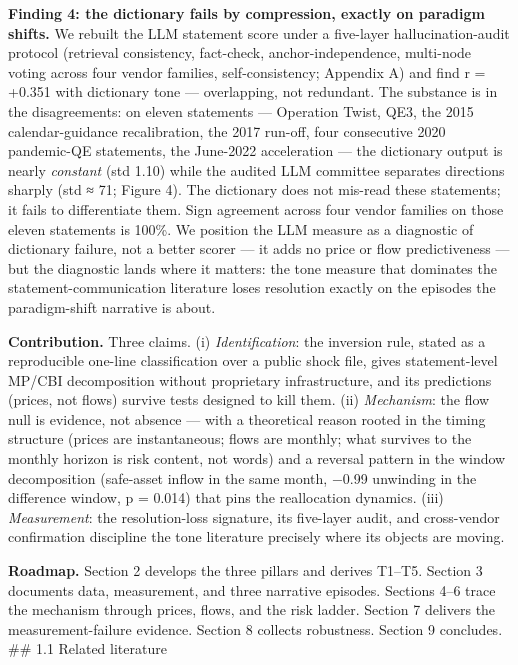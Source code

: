 \textbf{Finding 4: the dictionary fails by compression, exactly on paradigm shifts.} We rebuilt the LLM statement score under a five-layer hallucination-audit protocol (retrieval consistency, fact-check, anchor-independence, multi-node voting across four vendor families, self-consistency; Appendix A) and find r = +0.351 with dictionary tone --- overlapping, not redundant. The substance is in the disagreements: on eleven statements --- Operation Twist, QE3, the 2015 calendar-guidance recalibration, the 2017 run-off, four consecutive 2020 pandemic-QE statements, the June-2022 acceleration --- the dictionary output is nearly \emph{constant} (std 1.10) while the audited LLM committee separates directions sharply (std ≈ 71; Figure 4). The dictionary does not mis-read these statements; it fails to differentiate them. Sign agreement across four vendor families on those eleven statements is 100\%. We position the LLM measure as a diagnostic of dictionary failure, not a better scorer --- it adds no price or flow predictiveness --- but the diagnostic lands where it matters: the tone measure that dominates the statement-communication literature loses resolution exactly on the episodes the paradigm-shift narrative is about.

\textbf{Contribution.} Three claims. (i) \emph{Identification}: the inversion rule, stated as a reproducible one-line classification over a public shock file, gives statement-level MP/CBI decomposition without proprietary infrastructure, and its predictions (prices, not flows) survive tests designed to kill them. (ii) \emph{Mechanism}: the flow null is evidence, not absence --- with a theoretical reason rooted in the timing structure (prices are instantaneous; flows are monthly; what survives to the monthly horizon is risk content, not words) and a reversal pattern in the window decomposition (safe-asset inflow in the same month, −0.99 unwinding in the difference window, p = 0.014) that pins the reallocation dynamics. (iii) \emph{Measurement}: the resolution-loss signature, its five-layer audit, and cross-vendor confirmation discipline the tone literature precisely where its objects are moving.

\textbf{Roadmap.} Section 2 develops the three pillars and derives T1--T5. Section 3 documents data, measurement, and three narrative episodes. Sections 4--6 trace the mechanism through prices, flows, and the risk ladder. Section 7 delivers the measurement-failure evidence. Section 8 collects robustness. Section 9 concludes. \#\# 1.1 Related literature

